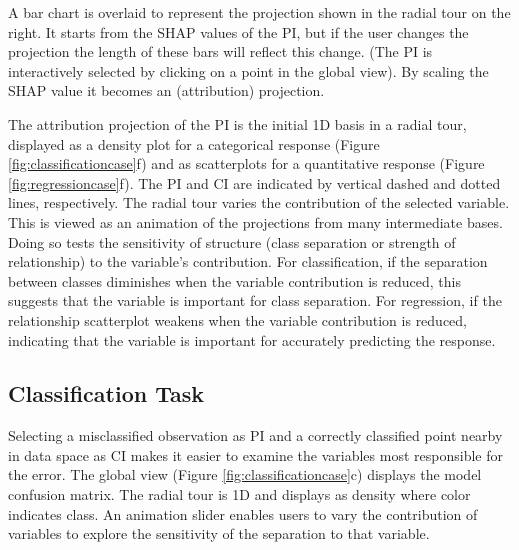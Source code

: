 \documentclass[
]{sn-jnl}
\begin{document}
A bar chart is overlaid to represent the projection shown in the radial
tour on the right. It starts from the SHAP values of the PI, but if the
user changes the projection the length of these bars will reflect this
change. (The PI is interactively selected by clicking on a point in the
global view). By scaling the SHAP value it becomes an (attribution)
projection.

The attribution projection of the PI is the initial 1D basis in a radial
tour, displayed as a density plot for a categorical response (Figure
\ref{fig:classificationcase}f) and as scatterplots for a quantitative
response (Figure \ref{fig:regressioncase}f). The PI and CI are indicated
by vertical dashed and dotted lines, respectively. The radial tour
varies the contribution of the selected variable. This is viewed as an
animation of the projections from many intermediate bases. Doing so
tests the sensitivity of structure (class separation or strength of
relationship) to the variable's contribution. For classification, if the
separation between classes diminishes when the variable contribution is
reduced, this suggests that the variable is important for class
separation. For regression, if the relationship scatterplot weakens when
the variable contribution is reduced, indicating that the variable is
important for accurately predicting the response.

\hypertarget{classification-task}{%
\subsection{Classification Task}\label{classification-task}}

Selecting a misclassified observation as PI and a correctly classified
point nearby in data space as CI makes it easier to examine the
variables most responsible for the error. The global view (Figure
\ref{fig:classificationcase}c) displays the model confusion matrix. The
radial tour is 1D and displays as density where color indicates class.
An animation slider enables users to vary the contribution of variables
to explore the sensitivity of the separation to that variable.
\end{document}
